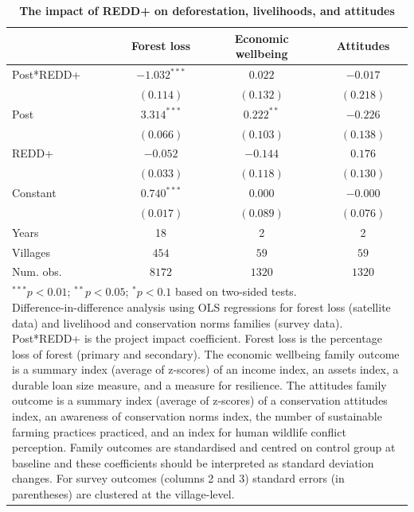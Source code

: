 \documentclass[
]{article}
\begin{document}
\begin{table}[h]
\caption{\textbf{The impact of REDD+ on deforestation, livelihoods, and attitudes}}
\begin{center}
\begin{tabular}{l c c c}
\hline
 & Forest loss & Economic wellbeing & Attitudes \\
\hline
Post*REDD+ & $-1.032^{***}$ & $0.022$      & $-0.017$  \\
           & $(0.114)$      & $(0.132)$    & $(0.218)$ \\
Post       & $3.314^{***}$  & $0.222^{**}$ & $-0.226$  \\
           & $(0.066)$      & $(0.103)$    & $(0.138)$ \\
REDD+      & $-0.052$       & $-0.144$     & $0.176$   \\
           & $(0.033)$      & $(0.118)$    & $(0.130)$ \\
Constant   & $0.740^{***}$  & $0.000$      & $-0.000$  \\
           & $(0.017)$      & $(0.089)$    & $(0.076)$ \\
\hline
Years      & 18             & 2            & 2         \\
Villages   & $454$          & $59$         & $59$      \\
Num. obs.  & $8172$         & $1320$       & $1320$    \\
\hline
\multicolumn{4}{l}{\scriptsize{\parbox{.6\linewidth}{\vspace{2pt}$^{***}p<0.01$; $^{**}p<0.05$; $^{*}p<0.1$ based on two-sided tests.\\
       Difference-in-difference analysis using OLS regressions for forest loss (satellite data) and livelihood and conservation norms families (survey data). Post*REDD+ is the project impact coefficient. Forest loss is the percentage loss of forest (primary and secondary). The economic wellbeing family outcome is a summary index (average of z-scores) of an income index, an assets index, a durable loan size measure, and a measure for resilience. The attitudes family outcome is a summary index (average of z-scores) of a conservation attitudes index, an awareness of conservation norms index, the number of sustainable farming practices practiced, and an index for human wildlife conflict perception. Family outcomes are standardised and centred on control group at baseline and these coefficients should be interpreted as standard deviation changes. For survey outcomes (columns 2 and 3) standard errors (in parentheses) are clustered at the village-level.}}}
\end{tabular}
\label{table:coefficients}
\end{center}
\end{table}
\end{document}
